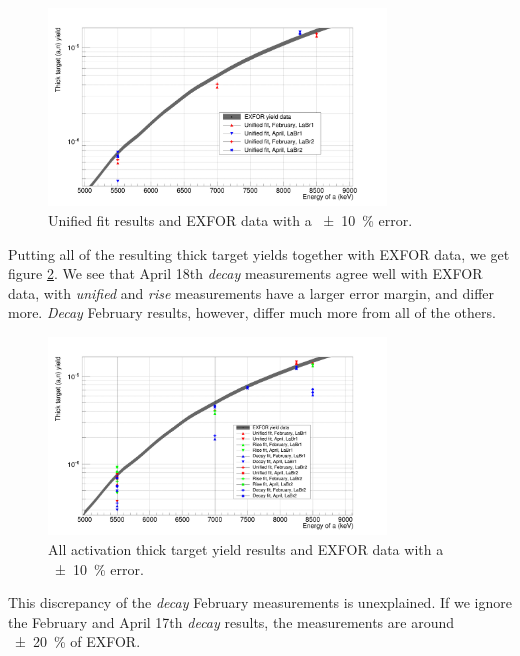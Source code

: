 \documentclass[a4paper,12pt]{report}
\begin{document}
\begin{figure}[H]
	\centering
	\includegraphics[width=0.80\textwidth]{reactions_v_energy_unified.png}
	\caption{Unified fit results and EXFOR data with a \qty{\pm 10}{\percent} error.}
	\label{reactions_v_energy_unified}
\end{figure}

Putting all of the resulting thick target yields together with EXFOR data, we get figure \ref{reactions_v_energy}.
We see that April 18th \textit{decay} measurements agree well with EXFOR data, with \textit{unified} and \textit{rise} measurements have a larger error margin, and differ more.
\textit{Decay} February results, however, differ much more from all of the others.

\begin{figure}[H]
	\centering
	\includegraphics[width=0.80\textwidth]{reactions_v_energy.png}
	\caption{All activation thick target yield results and EXFOR data with a \qty{\pm 10}{\percent} error.}
	\label{reactions_v_energy}
\end{figure}

This discrepancy of the \textit{decay} February measurements is unexplained.
If we ignore the February and April 17th \textit{decay} results, the measurements are around \qty{\pm 20}{\percent} of EXFOR.

\end{document}

